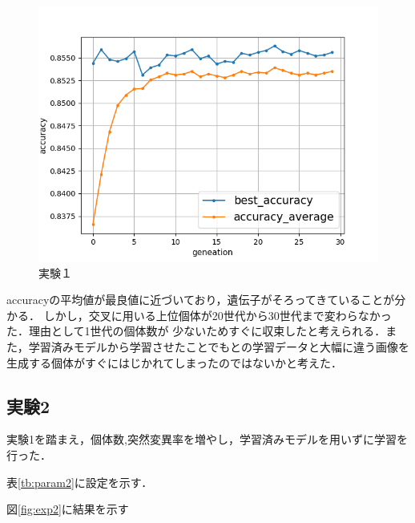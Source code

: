 \documentclass[twocolumn]{ujarticle}     %
\begin{document}

\begin{figure}[t]
	\centering
	\includegraphics[width=\linewidth]{figure1.png}
	\caption{実験１\label{fig:exp1}}
\end{figure}

accuracyの平均値が最良値に近づいており，遺伝子がそろってきていることが分かる．
しかし，交叉に用いる上位個体が20世代から30世代まで変わらなかった．理由として1世代の個体数が
少ないためすぐに収束したと考えられる．また，学習済みモデルから学習させたことでもとの学習データと大幅に違う画像を生成する個体がすぐにはじかれてしまったのではないかと考えた．


\subsection{実験2}
実験1を踏まえ，個体数,突然変異率を増やし，学習済みモデルを用いずに学習を行った．

表\ref{tb:param2}に設定を示す．
\begin{table}[h]
	\centering
	\caption{実験2\label{tb:param2}}
\end{table}

図\ref{fig:exp2}に結果を示す
\end{document}
